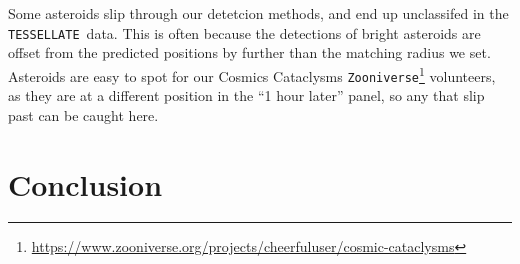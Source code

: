 \documentclass[12pt]{article}
\newcommand{\ttt}{\texttt}
\newcommand{\tessellate}{\texttt{TESSELLATE}}
\begin{document}
Some asteroids slip through our detetcion methods, and end up unclassifed in the \tessellate\ data.
This is often because the detections of bright asteroids are offset from the predicted positions by further than the matching radius we set.
Asteroids are easy to spot for our Cosmics Cataclysms \ttt{Zooniverse}\footnote{\url{https://www.zooniverse.org/projects/cheerfuluser/cosmic-cataclysms}} volunteers, as they are at a different position in the ``1 hour later'' panel, so any that slip past can be caught here.


\section{Conclusion}\label{sec:Conc}



\end{document}
